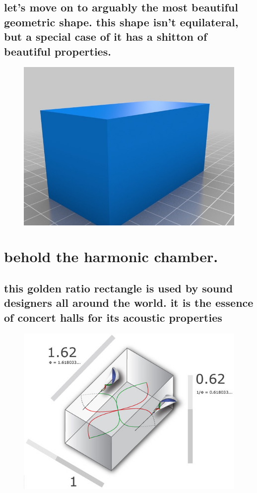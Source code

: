 \documentclass[paper=128mm:96mm, fontsize=9pt, pagesize]{scrartcl}
\begin{document}
\subsection{let's move on to arguably the most beautiful geometric shape.  this shape isn't equilateral, but a special case of it has a shitton of beautiful properties.}
\begin{figure}
	\centering
	\includegraphics[height=.5\textheight]{gfx/rectangle1.jpg}
\end{figure}

\clearpage

\section{behold the harmonic chamber.}
\subsection{this golden ratio rectangle is used by sound designers all around the world.  it is the essence of concert halls for its acoustic properties}
\begin{figure}
	\centering
	\includegraphics[height=.5\textheight]{gfx/harmonic_chamber.jpg}
\end{figure}
\end{document}
